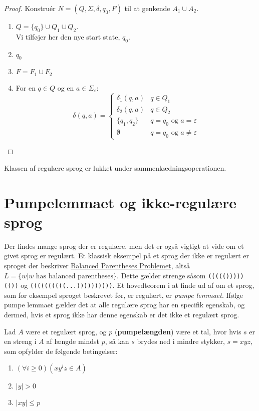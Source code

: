 \begin{proof}
Konstruér $N = (Q, \Sigma, \delta, q_{0}, F)$ til at genkende $A_1 \cup A_{2}$.
\begin{enumerate}
  \item $Q = \{q_{0}\} \cup Q_{1} \cup Q_{2}$.\\ Vi tilføjer her den nye start state, $q_{0}$.
  \item $q_{0}$
  \item $F = F_{1} \cup F_{2}$
  \item For en $q \in Q$ og en $a \in \Sigma_{\varepsilon}$:
        \begin{equation*}
\delta(q,a) = \begin{cases}
           \delta_{1}(q,a) & q \in Q_{1} \\
           \delta_{2}(q,a) & q \in Q_{2} \\
           \{q_{1}, q_{2}\} & q = q_{0} \text{ og } a = \varepsilon \\
           \emptyset & q = q_{0} \text{ og } a \neq \varepsilon
          \end{cases}
        \end{equation*}
\end{enumerate}

\end{proof}


\begin{theorem}
Klassen af regulære sprog er lukket under sammenkædningsoperationen.
\end{theorem}

\newpage
\section{Pumpelemmaet og ikke-regulære sprog}

Der findes mange sprog der er regulære, men det er også vigtigt at vide om et givet sprog er regulært. Et klassisk eksempel på et sprog der ikke er regulært er sproget der beskriver \href{https://www.hackerrank.com/challenges/balanced-brackets/problem}{Balanced Parentheses Problemet}, altså $L = \{w | w \text{ has balanced parentheses}\}$. Dette gælder strenge såsom \texttt{((((()))))(())} og \texttt{((((((((((...))))))))))}. Et hovedteorem i at finde ud af om et sprog, som for eksempel sproget beskrevet før, er regulært, er \textit{pumpe lemmaet}. Ifølge pumpe lemmaet gælder det at alle regulære sprog har en specifik egenskab, og dermed, hvis et sprog ikke har denne egenskab er det ikke et regulært sprog.

\begin{theorem}[Pumpelemmaet]
  Lad $A$ være et regulært sprog, og $p$ (\textbf{pumpelængden}) være et tal, hvor hvis $s$ er en streng i $A$ af længde mindst $p$, så kan $s$ brydes ned i mindre stykker, $s = xyz$, som opfylder de følgende betingelser:
  \begin{enumerate}
    \item $(\forall i \geq 0)(xy^{i}z \in A)$
    \item $|y| > 0$
    \item $|xy| \leq p$
  \end{enumerate}
\end{theorem}

